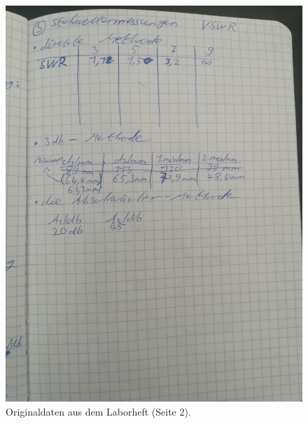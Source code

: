 \begin{figure}
    \centering
    \includegraphics[width=\textwidth]{content/data/daten2.jpg}
    \caption{Originaldaten aus dem Laborheft (Seite 2).}
\end{figure}
